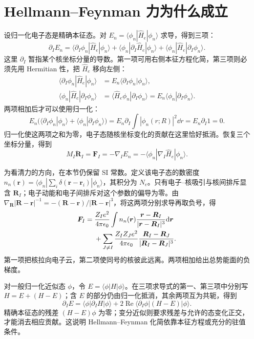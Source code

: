 \section{Hellmann--Feynman 力为什么成立}\label{bo:hellmann-feynman}
设归一化电子态是精确本征态。对 $E_n=\langle\phi_n|\hat H_e|\phi_n\rangle$ 求导，得到三项：
\begin{equation}
\partial_I E_n=\langle\partial_I\phi_n|\hat H_e|\phi_n\rangle+
\langle\phi_n|\partial_I\hat H_e|\phi_n\rangle+
\langle\phi_n|\hat H_e|\partial_I\phi_n\rangle.
\end{equation}
这里 $\partial_I$ 暂指某个核坐标分量的导数。第一项可用右侧本征方程化简，第三项则必须先用 Hermitian 性，把 $\hat H_e$ 移向左侧：
\begin{align}
\langle\partial_I\phi_n|\hat H_e|\phi_n\rangle
&=E_n\langle\partial_I\phi_n|\phi_n\rangle,\\
\langle\phi_n|\hat H_e|\partial_I\phi_n\rangle
&=\langle\hat H_e\phi_n|\partial_I\phi_n\rangle
=E_n\langle\phi_n|\partial_I\phi_n\rangle.
\end{align}
两项相加后才可以使用归一化：
\begin{equation}
E_n\bigl(\langle\partial_I\phi_n|\phi_n\rangle+
\langle\phi_n|\partial_I\phi_n\rangle\bigr)
=E_n\partial_I\int|\phi_n(r;R)|^2\dd r
=E_n\partial_I1=0.
\end{equation}
归一化使这两项之和为零，电子态随核坐标变化的贡献在这里恰好抵消。恢复三个坐标分量，得到
\begin{equation}\label{bo:force}
M_I\ddot{\bm R}_I=\bm F_I=-\nabla_I E_n
=-\langle\phi_n|\nabla_I\hat H_e|\phi_n\rangle.
\end{equation}

为看清力的方向，在本节仍保留 SI 常数。定义该电子态的数密度
$n_n(\bm r)=\langle\phi_n|\sum_i\delta(\bm r-\bm r_i)|\phi_n\rangle$，其积分为 $N_e$。只有电子--核吸引与核间排斥显含 $\bm R_I$；电子动能和电子间排斥对这个参数的偏导为零。由
$\nabla_{\bm R}|\bm R-\bm r|^{-1}=-(\bm R-\bm r)/|\bm R-\bm r|^3$，将这两项分别求导再取负号，得
\begin{align}
\bm F_I={}&\frac{Z_Ie^2}{4\pi\epsilon_0}
\int n_n(\bm r)\frac{\bm r-\bm R_I}{|\bm r-\bm R_I|^3}\mathrm{d}\bm r\notag\\
&+\sum_{J\ne I}\frac{Z_IZ_Je^2}{4\pi\epsilon_0}
\frac{\bm R_I-\bm R_J}{|\bm R_I-\bm R_J|^3}.
\end{align}
第一项把核拉向电子云，第二项使同号的核彼此远离。两项相加给出总势能面的负梯度。

对一般归一化近似态 $\phi$，令 $E=\langle\phi|H|\phi\rangle$。在三项求导式的第一、第三项中分别写 $H=E+(H-E)$；含 $E$ 的部分仍由归一化抵消，其余两项互为共轭，得到
\begin{equation}
\partial_I E=\langle\phi|\partial_IH|\phi\rangle
+2\operatorname{Re}\langle\partial_I\phi|(H-E)|\phi\rangle.
\end{equation}
精确本征态的残差 $(H-E)\phi$ 为零；变分近似则要求残差与允许的态变化正交，才能消去相应贡献。这说明 Hellmann--Feynman 化简依靠本征方程或充分的驻值条件。

